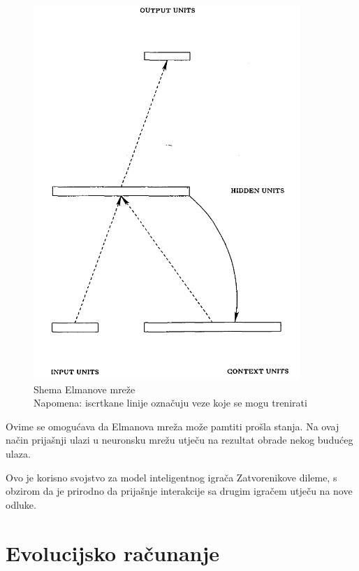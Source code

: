 \documentclass[zavrsnirad]{fer}
\begin{document}
		\begin{figure}[htb]
			\centering
			\includegraphics[width=0.9\textwidth]{Extra/ElmanovaMreza.png} 
			\caption{Shema Elmanove mreže \\
					 Napomena: iscrtkane linije označuju veze koje se mogu trenirati}
			\label{ElmanovaMreza}
		\end{figure}
		
		Ovime se omogućava da Elmanova mreža može pamtiti prošla stanja. Na ovaj način prijašnji ulazi u neuronsku mrežu utječu na rezultat obrade nekog budućeg ulaza.
		
		Ovo je korisno svojstvo za model inteligentnog igrača Zatvorenikove dileme, s obzirom da je prirodno da prijašnje interakcije sa drugim igračem utječu na nove odluke.
	
\chapter{Evolucijsko računanje}
\label{pog:EvolucijskoRacunanje}
\end{document}
